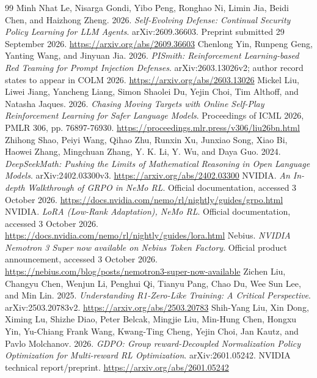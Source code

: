 \documentclass[11pt,a4paper]{article}
\begin{document}
\begin{thebibliography}{99}
 Minh Nhat Le, Nisarga Gondi, Yibo Peng, Ronghao Ni, Limin Jia, Beidi Chen, and Haizhong Zheng. 2026. \emph{Self-Evolving Defense: Continual Security Policy Learning for LLM Agents}. arXiv:2609.36603. Preprint submitted 29 September 2026. \url{https://arxiv.org/abs/2609.36603}
 Chenlong Yin, Runpeng Geng, Yanting Wang, and Jinyuan Jia. 2026. \emph{PISmith: Reinforcement Learning-based Red Teaming for Prompt Injection Defenses}. arXiv:2603.13026v2; author record states to appear in COLM 2026. \url{https://arxiv.org/abs/2603.13026}
 Mickel Liu, Liwei Jiang, Yancheng Liang, Simon Shaolei Du, Yejin Choi, Tim Althoff, and Natasha Jaques. 2026. \emph{Chasing Moving Targets with Online Self-Play Reinforcement Learning for Safer Language Models}. Proceedings of ICML 2026, PMLR 306, pp. 76897-76930. \url{https://proceedings.mlr.press/v306/liu26bn.html}
 Zhihong Shao, Peiyi Wang, Qihao Zhu, Runxin Xu, Junxiao Song, Xiao Bi, Haowei Zhang, Mingchuan Zhang, Y. K. Li, Y. Wu, and Daya Guo. 2024. \emph{DeepSeekMath: Pushing the Limits of Mathematical Reasoning in Open Language Models}. arXiv:2402.03300v3. \url{https://arxiv.org/abs/2402.03300}
 NVIDIA. \emph{An In-depth Walkthrough of GRPO in NeMo RL}. Official documentation, accessed 3 October 2026. \url{https://docs.nvidia.com/nemo/rl/nightly/guides/grpo.html}
 NVIDIA. \emph{LoRA (Low-Rank Adaptation), NeMo RL}. Official documentation, accessed 3 October 2026. \url{https://docs.nvidia.com/nemo/rl/nightly/guides/lora.html}
 Nebius. \emph{NVIDIA Nemotron 3 Super now available on Nebius Token Factory}. Official product announcement, accessed 3 October 2026. \url{https://nebius.com/blog/posts/nemotron3-super-now-available}
 Zichen Liu, Changyu Chen, Wenjun Li, Penghui Qi, Tianyu Pang, Chao Du, Wee Sun Lee, and Min Lin. 2025. \emph{Understanding R1-Zero-Like Training: A Critical Perspective}. arXiv:2503.20783v2. \url{https://arxiv.org/abs/2503.20783}
 Shih-Yang Liu, Xin Dong, Ximing Lu, Shizhe Diao, Peter Belcak, Mingjie Liu, Min-Hung Chen, Hongxu Yin, Yu-Chiang Frank Wang, Kwang-Ting Cheng, Yejin Choi, Jan Kautz, and Pavlo Molchanov. 2026. \emph{GDPO: Group reward-Decoupled Normalization Policy Optimization for Multi-reward RL Optimization}. arXiv:2601.05242. NVIDIA technical report/preprint. \url{https://arxiv.org/abs/2601.05242}

\end{thebibliography}
\end{document}
